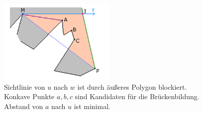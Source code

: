 \begin{figure}[t]
  \centering
  \includegraphics[width=0.5\textwidth]{bilder/blockedray.png}
  \caption[Ermittlung eines Ersatzpunktes, wenn die Sicht blockiert ist]{\centering Sichtlinie von $u$ nach $w$ ist durch äußeres Polygon blockiert. Konkave Punkte $a, b, c$ sind Kandidaten für die Brückenbildung. 
  Abstand von $a$ nach $u$ ist minimal.\cite{eberly}}
  \label{fig:wNotVisible}
\end{figure}\break

